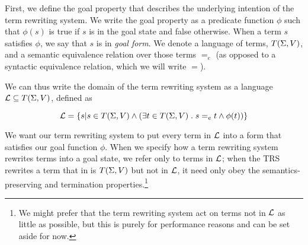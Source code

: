 
First, we define the goal property that describes the underlying intention of the term rewriting system. We write the goal property as a predicate function $\phi$ such that $\phi(s)$ is true if $s$ is in the goal state and false otherwise. When a term $s$ satisfies $\phi$, we say that $s$ is in \emph{goal form}. We denote a language of terms, $T(\Sigma,V)$, and a semantic equivalence relation over those terms $=_e$ (as opposed to a syntactic equivalence relation, which we will write $=$).  

We can thus write the domain of the term rewriting system as a language $\mathcal{L} \subseteq T(\Sigma,V)$, defined as

\[
\mathcal{L} = \{s | s \in T(\Sigma,V) \wedge (\exists t \in T(\Sigma,V)\;.\; s =_e t \wedge \phi(t))\}
\]

We want our term rewriting system to put every term in $\mathcal{L}$ into a form that satisfies our goal function $\phi$. When we specify how a term rewriting system rewrites terms into a goal state, we refer only to terms in $\mathcal{L}$; when the TRS rewrites a term that in is $T(\Sigma,V)$ but not in $\mathcal{L}$, it need only obey the semantics-preserving and termination properties.\footnote{We might prefer that the term rewriting system act on terms not in $\mathcal{L}$ as little as possible, but this is purely for performance reasons and can be set aside for now.}


